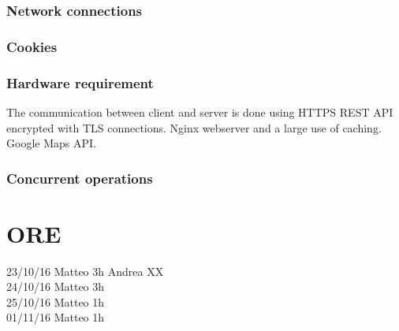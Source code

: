 \documentclass[english]{article}
\newcounter{requirement}
\begin{document}
\subsubsection{Network connections}


\subsubsection{Cookies}



\subsubsection{Hardware requirement}
The communication between client and server is done using HTTPS REST API encrypted with TLS connections.
Nginx webserver and a large use of caching.
Google Maps API.



\subsubsection{Concurrent operations}

\section{ORE}
23/10/16 
Matteo 3h 
Andrea XX\\
24/10/16 
Matteo 3h\\
25/10/16 
Matteo 1h\\
01/11/16
Matteo 1h\\
\end{document}
